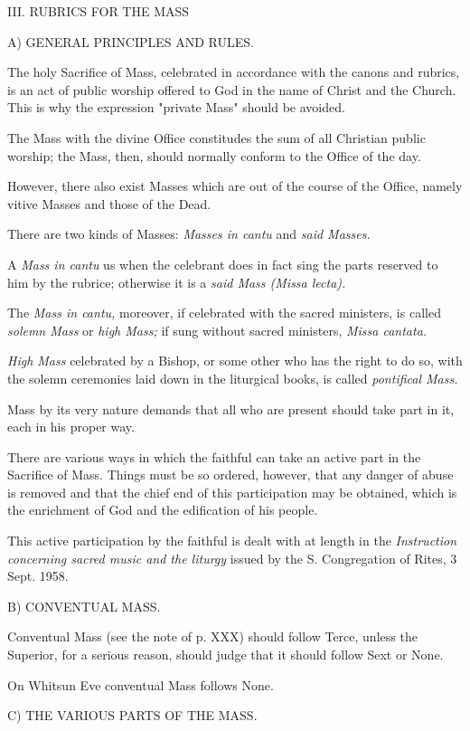 III. RUBRICS FOR THE MASS

A) GENERAL PRINCIPLES AND RULES.

The holy Sacrifice of Mass, celebrated in accordance with the canons and rubrics, is an act of public worship offered to God in the name of Christ and the Church. This is why the expression "private Mass" should be avoided.

The Mass with the divine Office constitudes the sum of all Christian public worship; the Mass, then, should normally conform to the Office of the day.

However, there also exist Masses which are out of the course of the Office, namely vitive Masses and those of the Dead.

There are two kinds of Masses: {\it Masses in cantu} and {\it said Masses.}

A {\it Mass in cantu} us when the celebrant does in fact sing the parts reserved to him by the rubrice; otherwise it is a {\it said Mass (Missa lecta).}

The {\it Mass in cantu,} moreover, if celebrated with the sacred ministers, is called {\it solemn Mass} or {\it high Mass;} if sung without sacred ministers, {\it Missa cantata.}

{\it High Mass} celebrated by a Bishop, or some other who has the right to do so, with the solemn ceremonies laid down in the liturgical books, is called {\it pontifical Mass.}

Mass by its very nature demands that all who are present should take part in it, each in his proper way.

There are various ways in which the faithful can take an active part in the Sacrifice of Mass. Things must be so ordered, however, that any danger of abuse is removed and that the chief end of this participation may be obtained, which is the enrichment of God and the edification of his people.

This active participation by the faithful is dealt with at length in the {\it Instruction concerning sacred music and the liturgy} issued by the S. Congregation of Rites, 3 Sept. 1958.

B) CONVENTUAL MASS.

Conventual Mass (see the note of p. XXX) should follow Terce, unless the Superior, for a serious reason, should judge that it should follow Sext or None.

On Whitsun Eve conventual Mass follows None.

C) THE VARIOUS PARTS OF THE MASS.

